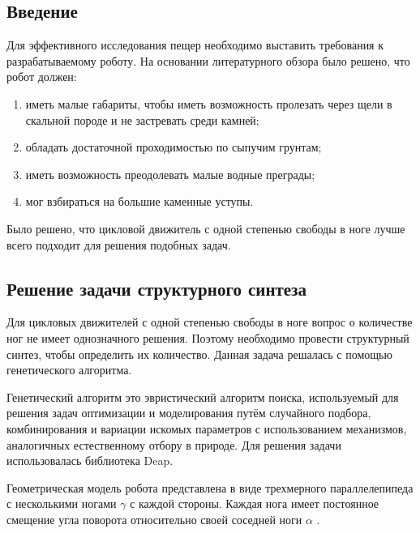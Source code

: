 \subsection{Введение}
Для эффективного исследования пещер необходимо выставить требования к разрабатываемому роботу. На основании литературного обзора было решено, что робот должен:
\begin{enumerate}
    \item иметь малые габариты, чтобы иметь возможность пролезать через щели в скальной породе и не застревать среди камней;
    \item обладать достаточной проходимостью по сыпучим грунтам;
    \item иметь возможность преодолевать малые водные преграды;
    \item мог взбираться на большие каменные уступы.
\end{enumerate}

Было решено, что цикловой движитель с одной степенью свободы в ноге лучше всего подходит для решения подобных задач.


\subsection{Решение задачи структурного синтеза}
Для цикловых движителей с одной степенью свободы в ноге вопрос о количестве ног не имеет однозначного решения. Поэтому необходимо провести структурный синтез, чтобы определить их количество. Данная задача решалась с помощью генетического алгоритма.

Генетический алгоритм это эвристический алгоритм поиска, используемый для решения задач оптимизации и моделирования путём случайного подбора, комбинирования и вариации искомых параметров с использованием механизмов, аналогичных естественному отбору в природе. Для решения задачи использовалась библиотека Deap.

Геометрическая модель робота представлена в виде трехмерного параллелепипеда с несколькими ногами $\gamma$ с каждой стороны. Каждая нога имеет постоянное смещение угла поворота относительно своей соседней ноги $\alpha$ .

